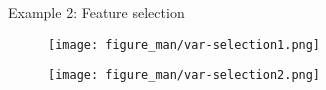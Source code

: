 \documentclass[11pt,compress,t,notes=noshow, xcolor=table]{beamer}
\begin{document}
\begin{vbframe}{Example 2: Feature selection}



\framebreak

\begin{center}
\begin{figure}
    \texttt{[image: figure\_man/var-selection1.png]}
\end{figure}
\end{center}

\framebreak

\begin{center}
\begin{figure}
    \texttt{[image: figure\_man/var-selection2.png]}
\end{figure}
\end{center}

\end{vbframe}





\end{document}
